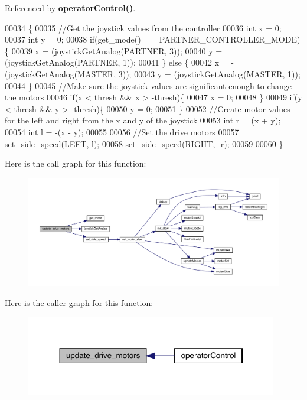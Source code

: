 Referenced by \textbf{ operator\+Control()}.


\begin{DoxyCode}
00034                           \{
00035   \textcolor{comment}{//Get the joystick values from the controller}
00036   \textcolor{keywordtype}{int} x = 0;
00037   \textcolor{keywordtype}{int} y = 0;
00038   \textcolor{keywordflow}{if}(get_mode() == PARTNER_CONTROLLER_MODE) \{
00039     x = (joystickGetAnalog(PARTNER, 3));
00040     y = (joystickGetAnalog(PARTNER, 1));
00041   \} \textcolor{keywordflow}{else} \{
00042     x = -(joystickGetAnalog(MASTER, 3));
00043     y = (joystickGetAnalog(MASTER, 1));
00044   \}
00045   \textcolor{comment}{//Make sure the joystick values are significant enough to change the motors}
00046   \textcolor{keywordflow}{if}(x < thresh && x > -thresh)\{
00047     x = 0;
00048   \}
00049   \textcolor{keywordflow}{if}(y < thresh && y > -thresh)\{
00050     y = 0;
00051   \}
00052   \textcolor{comment}{//Create motor values for the left and right from the x and y of the joystick}
00053   \textcolor{keywordtype}{int} r = (x + y);
00054   \textcolor{keywordtype}{int} l = -(x - y);
00055 
00056   \textcolor{comment}{//Set the drive motors}
00057   set_side_speed(LEFT, l);
00058   set_side_speed(RIGHT, -r);
00059 
00060 \}
\end{DoxyCode}
Here is the call graph for this function\+:\nopagebreak
\begin{figure}[H]
\begin{center}
\leavevmode
\includegraphics[width=350pt]{drive_8c_a8224a4626a934d30ed587671b7004bf8_cgraph}
\end{center}
\end{figure}
Here is the caller graph for this function\+:\nopagebreak
\begin{figure}[H]
\begin{center}
\leavevmode
\includegraphics[width=311pt]{drive_8c_a8224a4626a934d30ed587671b7004bf8_icgraph}
\end{center}
\end{figure}


